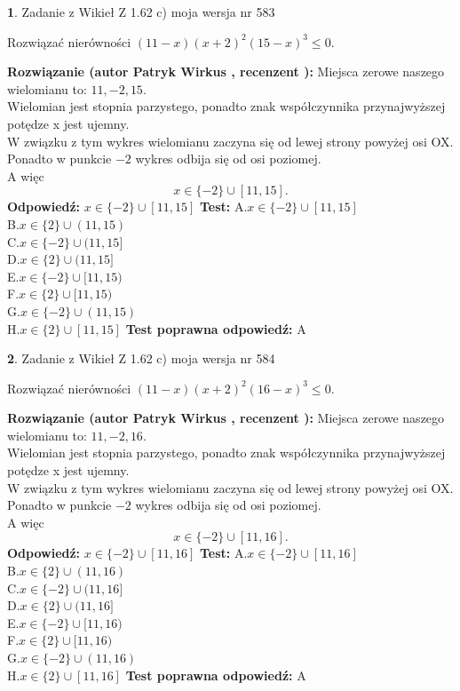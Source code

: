 \documentclass[12pt, a4paper]{article}
\theoremstyle{definition} %
\newtheorem{zad}{}
\newcommand{\zadStart}[1]{\begin{zad}#1\newline}
\newcommand{\zadStop}{\end{zad}}
\newcommand{\rozwStart}[2]{\noindent \textbf{Rozwiązanie (autor #1 , recenzent #2): }\newline}
\newcommand{\rozwStop}{\newline}
\newcommand{\odpStart}{\noindent \textbf{Odpowiedź:}\newline}
\newcommand{\odpStop}{\newline}
\newcommand{\testStart}{\noindent \textbf{Test:}\newline}
\newcommand{\testStop}{\newline}
\newcommand{\kluczStart}{\noindent \textbf{Test poprawna odpowiedź:}\newline}
\newcommand{\kluczStop}{\newline}
\begin{document}
\zadStart{Zadanie z Wikieł Z 1.62 c) moja wersja nr 583}

Rozwiązać nierówności $(11-x)(x+2)^{2}(15-x)^{3}\le0$.
\zadStop
\rozwStart{Patryk Wirkus}{}
Miejsca zerowe naszego wielomianu to: $11, -2, 15$.\\
Wielomian jest stopnia parzystego, ponadto znak współczynnika przy\linebreak najwyższej potędze x jest ujemny.\\ W związku z tym wykres wielomianu zaczyna się od lewej strony powyżej osi OX.\\
Ponadto w punkcie $-2$ wykres odbija się od osi poziomej.\\
A więc $$x \in \{-2\} \cup [11,15].$$
\rozwStop
\odpStart
$x \in \{-2\} \cup [11,15]$
\odpStop
\testStart
A.$x \in \{-2\} \cup [11,15]$\\
B.$x \in \{2\} \cup (11,15)$\\
C.$x \in \{-2\} \cup (11,15]$\\
D.$x \in \{2\} \cup (11,15]$\\
E.$x \in \{-2\} \cup [11,15)$\\
F.$x \in \{2\} \cup [11,15)$\\
G.$x \in \{-2\} \cup (11,15)$\\
H.$x \in \{2\} \cup [11,15]$
\testStop
\kluczStart
A
\kluczStop



\zadStart{Zadanie z Wikieł Z 1.62 c) moja wersja nr 584}

Rozwiązać nierówności $(11-x)(x+2)^{2}(16-x)^{3}\le0$.
\zadStop
\rozwStart{Patryk Wirkus}{}
Miejsca zerowe naszego wielomianu to: $11, -2, 16$.\\
Wielomian jest stopnia parzystego, ponadto znak współczynnika przy\linebreak najwyższej potędze x jest ujemny.\\ W związku z tym wykres wielomianu zaczyna się od lewej strony powyżej osi OX.\\
Ponadto w punkcie $-2$ wykres odbija się od osi poziomej.\\
A więc $$x \in \{-2\} \cup [11,16].$$
\rozwStop
\odpStart
$x \in \{-2\} \cup [11,16]$
\odpStop
\testStart
A.$x \in \{-2\} \cup [11,16]$\\
B.$x \in \{2\} \cup (11,16)$\\
C.$x \in \{-2\} \cup (11,16]$\\
D.$x \in \{2\} \cup (11,16]$\\
E.$x \in \{-2\} \cup [11,16)$\\
F.$x \in \{2\} \cup [11,16)$\\
G.$x \in \{-2\} \cup (11,16)$\\
H.$x \in \{2\} \cup [11,16]$
\testStop
\kluczStart
A
\kluczStop
\end{document}
